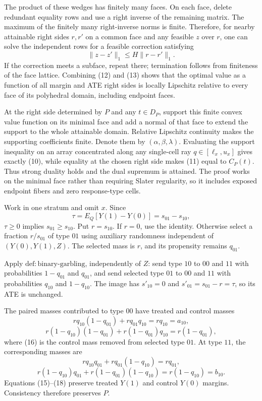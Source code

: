 The product of these wedges has finitely many faces. On each face, delete redundant equality rows and use a right inverse of the remaining matrix. The maximum of the finitely many right-inverse norms is finite. Therefore, for nearby attainable right sides \(r,r'\) on a common face and any feasible \(z\) over \(r\), one can solve the independent rows for a feasible correction satisfying
\[
\|z-z'\|_1\leq H\|r-r'\|_1. \tag{13}
\]
If the correction meets a subface, repeat there; termination follows from finiteness of the face lattice. Combining (12) and (13) shows that the optimal value as a function of all margin and ATE right sides is locally Lipschitz relative to every face of its polyhedral domain, including endpoint faces.

At the right side determined by \(P\) and any \(t\in D_P\), support this finite convex value function on its minimal face and add a normal of that face to extend the support to the whole attainable domain. Relative Lipschitz continuity makes the supporting coefficients finite. Denote them by \((\alpha,\beta,\lambda)\). Evaluating the support inequality on an array concentrated along any single-cell ray \(q\in[\ell_x,u_x]\) gives exactly (10), while equality at the chosen right side makes (11) equal to \(C_P(t)\). Thus strong duality holds and the dual supremum is attained. The proof works on the minimal face rather than requiring Slater regularity, so it includes exposed endpoint fibers and zero response-type cells.

Work in one stratum and omit \(x\). Since
\[
\tau=E_Q[Y(1)-Y(0)]=s_{01}-s_{10}, \tag{14}
\]
\(\tau\geq0\) implies \(s_{01}\geq s_{10}\). Put \(r=s_{10}\). If \(r=0\), use the identity. Otherwise select a fraction \(r/s_{01}\) of type \(01\) using auxiliary randomness independent of \((Y(0),Y(1),Z)\). The selected mass is \(r\), and its propensity remains \(q_{01}\).

Apply \(\mathrm{def{:}binary\mbox{-}garbling}\), independently of \(Z\): send type \(10\) to \(00\) and \(11\) with probabilities \(1-q_{01}\) and \(q_{01}\), and send selected type \(01\) to \(00\) and \(11\) with probabilities \(q_{10}\) and \(1-q_{10}\). The image has \(s'_{10}=0\) and \(s'_{01}=s_{01}-r=\tau\), so its ATE is unchanged.

The paired masses contributed to type \(00\) have treated and control masses
\[
rq_{10}(1-q_{01})+rq_{01}q_{10}=rq_{10}=a_{10}, \tag{15}
\]
\[
r(1-q_{10})(1-q_{01})+r(1-q_{01})q_{10}=r(1-q_{01}), \tag{16}
\]
where (16) is the control mass removed from selected type \(01\). At type \(11\), the corresponding masses are
\[
rq_{10}q_{01}+rq_{01}(1-q_{10})=rq_{01}, \tag{17}
\]
\[
r(1-q_{10})q_{01}+r(1-q_{01})(1-q_{10})=r(1-q_{10})=b_{10}. \tag{18}
\]
Equations (15)--(18) preserve treated \(Y(1)\) and control \(Y(0)\) margins. Consistency therefore preserves \(P\).

